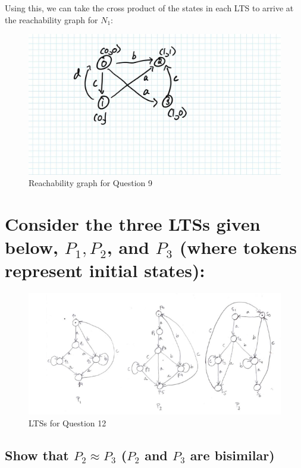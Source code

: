 \documentclass{article}[8pt]
\renewcommand{\thesubsection}{\thesection.\alph{subsection}}
\begin{document}
Using this, we can take the cross product of the states in each LTS to arrive at the reachability graph for $N_1$:

\begin{figure}[H]
	\includegraphics[width=\linewidth]{./imgs/Question-9-Reachability-Graph.png}
	\caption{Reachability graph for Question 9}
	\label{fig:Question-9}
\end{figure}

\section[Question ~\thesection]{Consider the three LTSs given below, $P_1, P_2$, and $P_3$ (where tokens represent initial states):}

\begin{figure}[H]
	\includegraphics[width=\linewidth]{./imgs/Question-12.png}
	\caption{LTSs for Question 12}
	\label{fig:Question-12}
\end{figure}

\subsection[~\thesubsection]{Show that $P_2 \approx P_3$ ($P_2$ and $P_3$ are bisimilar)}
\end{document}
